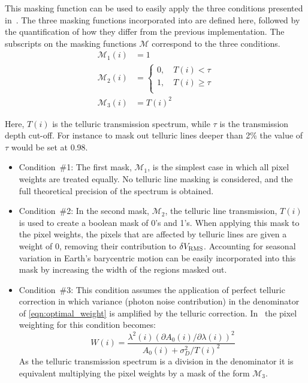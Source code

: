 This masking function can be used to easily apply the three conditions presented in~\citet{figueira_radial_2016}.
The three masking functions incorporated into \eniric{} are defined here, followed by the quantification of how they differ from the previous implementation.
The subscripts on the masking functions \(\mathcal{M}\) correspond to the three conditions.
\begin{align}
{\mathcal{M}}_{1}(i) &= 1 \label{eqn:mask1}\\
{\mathcal{M}}_{2}(i) &= \begin{cases}
0, \hspace{1em} T(i) < \tau\\
1, \hspace{1em} T(i) \ge \tau\\
\end{cases}\label{eqn:mask2}\\
{\mathcal{M}}_{3}(i) &= {T(i)}^{2} \label{eqn:mask3}
\end{align}

Here, \(T(i)\) is the telluric transmission spectrum, while \(\tau\) is the transmission depth cut-off.
For instance to mask out telluric lines deeper than 2\% the value of \(\tau\) would be set at 0.98.

\begin{itemize}
    \setlength\itemsep{-0.2em} %
    \item Condition~\#1:
    The first mask, \({\mathcal{M}}_{1}\), is the simplest case in which all pixel weights are treated equally.
    No telluric line masking is considered, and the full theoretical precision of the spectrum is obtained.
    
    \item Condition~\#2:
    In the second mask, \({\mathcal{M}}_{2}\), the telluric line transmission, \(T(i)\) is used to create a boolean mask of 0's and 1's.
    When applying this mask to the pixel weights, the pixels that are affected by telluric lines are given a weight of 0, removing their contribution to \(\delta {V}_{\textrm{RMS}}\).
    Accounting for seasonal variation in Earth's barycentric motion can be easily incorporated into this mask by increasing the width of the regions masked out.
    
    \item Condition~\#3:
    This condition assumes the application of perfect telluric correction in which variance (photon noise contribution) in the denominator of \cref{eqn:optimal_weight} is amplified by the telluric correction.
    In~\citep{figueira_radial_2016} the pixel weighting for this condition becomes:
    \begin{equation}
    W(i) = \frac{{\lambda}^{2}(i) {({\partial {A}_{0}(i)}/{\partial \lambda(i)})}^{2}}{A_0(i) + {\sigma}^{2}_{D}/{T(i)}^{2}} \label{eqn:optimal_weight_transmission}
    \end{equation}
    As the telluric transmission spectrum is a division in the denominator it is equivalent multiplying the pixel weights by a mask of the form \({\mathcal{M}}_{3}\).
\end{itemize}

